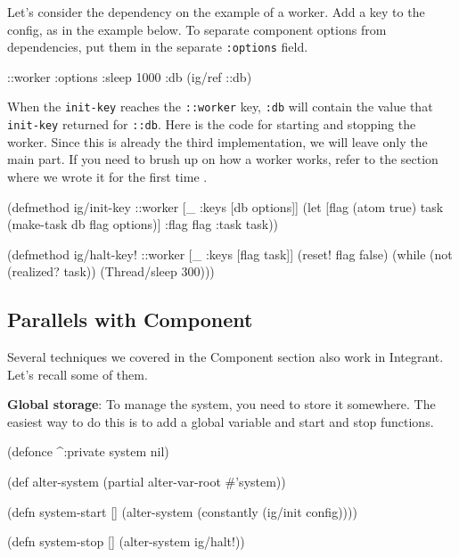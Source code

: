 Let's consider the dependency on the example of a worker. Add a key to the config, as in the example below. To separate component options from dependencies, put them in the separate \verb|:options| field.

\begin{english}
  \begin{clojure}
{::worker {:options {:sleep 1000}
           :db (ig/ref ::db)}}
  \end{clojure}
\end{english}

When the \verb|init-key| reaches the \verb|::worker| key, \verb|:db| will contain the value that \verb|init-key| returned for \verb|::db|. Here is the code for starting and stopping the worker. Since this is already the third implementation, we will leave only the main part. If you need to brush up on how a worker works, refer to the section where we wrote it for the first time .

\begin{english}
  \begin{clojure}
(defmethod ig/init-key ::worker
  [_ {:keys [db options]}]
  (let [flag (atom true)
        task (make-task db flag options)]
    {:flag flag :task task}))

(defmethod ig/halt-key! ::worker
  [_ {:keys [flag task]}]
  (reset! flag false)
  (while (not (realized? task))
    (Thread/sleep 300)))
  \end{clojure}
\end{english}

\subsection{Parallels with Component}

Several techniques we covered in the Component section also work in Integrant. Let's recall some of them.


\textbf{Global storage}: To manage the system, you need to store it somewhere. The easiest way to do this is to add a global variable and start and stop functions.

\ifnarrow

\begin{english}
  \begin{clojure}
(defonce ^:private system nil)

(def alter-system
  (partial alter-var-root #'system))

(defn system-start []
  (alter-system
    (constantly (ig/init config))))

(defn system-stop []
  (alter-system ig/halt!))
  \end{clojure}
\end{english}

